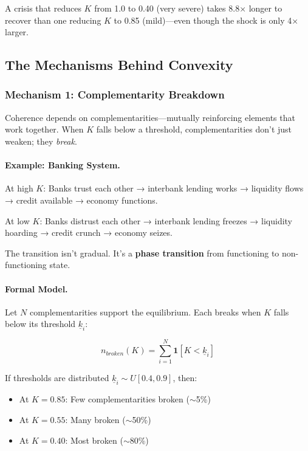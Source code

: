 A crisis that reduces $K$ from 1.0 to 0.40 (very severe) takes 8.8× longer 
to recover than one reducing $K$ to 0.85 (mild)---even though the shock 
is only 4× larger.

\subsection{The Mechanisms Behind Convexity}

\subsubsection{Mechanism 1: Complementarity Breakdown}

Coherence depends on complementarities---mutually reinforcing elements 
that work together. When $K$ falls below a threshold, complementarities 
don't just weaken; they \emph{break}.

\paragraph{Example: Banking System.}
At high $K$: Banks trust each other → interbank lending works → liquidity flows → credit available → economy functions.

At low $K$: Banks distrust each other → interbank lending freezes → liquidity hoarding → credit crunch → economy seizes.

The transition isn't gradual. It's a \textbf{phase transition} from functioning 
to non-functioning state.

\paragraph{Formal Model.}
Let $N$ complementarities support the equilibrium. Each breaks when $K$ falls 
below its threshold $\underline{k}_i$:

\begin{equation}
n_{broken}(K) = \sum_{i=1}^{N} \mathbf{1}[K < \underline{k}_i]
\end{equation}

If thresholds are distributed $\underline{k}_i \sim U[0.4, 0.9]$, then:
\begin{itemize}
    \item At $K = 0.85$: Few complementarities broken ($\sim$5\%)
    \item At $K = 0.55$: Many broken ($\sim$50\%)
    \item At $K = 0.40$: Most broken ($\sim$80\%)
\end{itemize}


